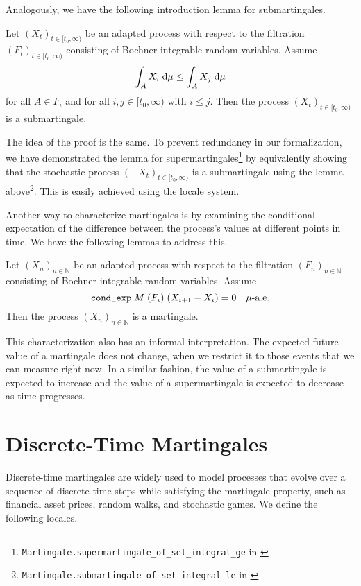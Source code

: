 Analogously, we have the following introduction lemma for submartingales.

\begin{lemma}
	Let $(X_t)_{t \in [t_0,\infty)}$ be an adapted process with respect to the filtration $(F_t)_{t \in [t_0,\infty)}$ consisting of Bochner-integrable random variables.
  Assume 
  \[
  \normalfont \int_A X_i \;\textrm{d}\mu \le \int_A X_j \;\textrm{d}\mu
  \] 
  for all $A \in F_i$ and for all $i,j \in [t_0,\infty)$ with $i \le j$. Then the process $(X_t)_{t \in [t_0,\infty)}$ is a submartingale.
\end{lemma}

The idea of the proof is the same. To prevent redundancy in our formalization, we have demonstrated the lemma for supermartingales\footnote{\texttt{Martingale.supermartingale\_of\_set\_integral\_ge} in \cite{Keskin_A_Formalization_of_2023}} by equivalently showing that the stochastic process $(-X_t)_{t \in [t_0,\infty)}$ is a submartingale using the lemma above\footnote{\texttt{Martingale.submartingale\_of\_set\_integral\_le} in \cite{Keskin_A_Formalization_of_2023}}. This is easily achieved using the locale system.

Another way to characterize martingales is by examining the conditional expectation of the difference between the process's values at different points in time. We have the following lemmas to address this.

\begin{lemma}
  Let $(X_n)_{n \in \mathbb{N}}$ be an adapted process with respect to the filtration $(F_n)_{n \in \mathbb{N}}$ consisting of Bochner-integrable random variables. Assume 
  \[
  \normalfont \texttt{cond\_exp} \; M \; (F_i) \; (X_{i+1} - X_i) = 0 \quad\mu\textrm{-a.e.}
  \] 
  Then the process $(X_n)_{n \in \mathbb{N}}$ is a martingale.
\end{lemma}

This characterization also has an informal interpretation. The expected future value of a martingale does not change, when we restrict it to those events that we can measure right now. In a similar fashion, the value of a submartingale is expected to increase and the value of a supermartingale is expected to decrease as time progresses.

\section{Discrete-Time Martingales}

Discrete-time martingales are widely used to model processes that evolve over a sequence of discrete time steps while satisfying the martingale property, such as financial asset prices, random walks, and stochastic games. We define the following locales.


